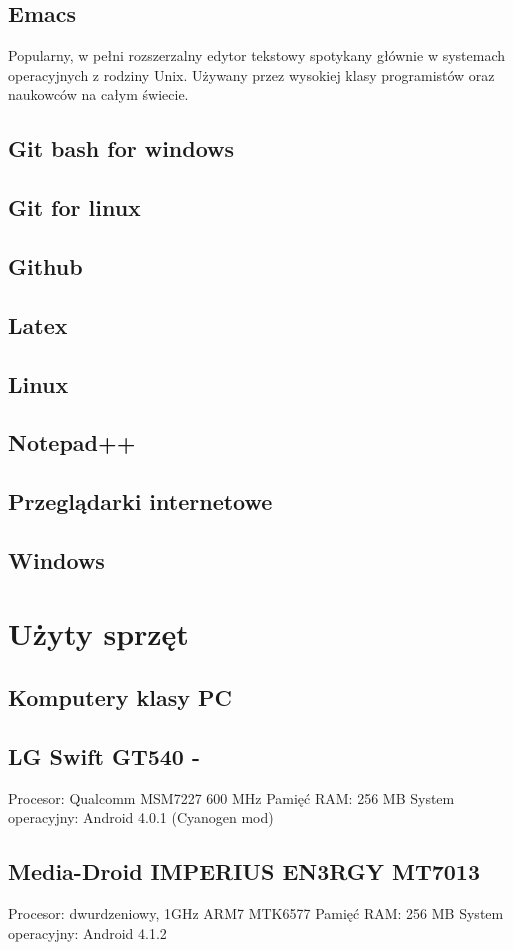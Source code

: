 \documentclass[11pt,a4paper,polish,thesis]{dcsbook}
\begin{document}
\subsection{Emacs}
Popularny, w pełni rozszerzalny edytor tekstowy spotykany głównie w systemach operacyjnych z rodziny Unix. Używany przez wysokiej klasy programistów oraz naukowców na całym świecie.
\subsection{Git bash for windows}
\subsection{Git for linux}
\subsection{Github}
\subsection{Latex}
\subsection{Linux}
\subsection{Notepad++}
\subsection{Przeglądarki internetowe}
\subsection{Windows}
\section{Użyty sprzęt}

\subsection{Komputery klasy PC}
\subsection{LG Swift GT540 - }
Procesor: Qualcomm MSM7227 600 MHz
Pamięć RAM: 256 MB
System operacyjny: Android 4.0.1 (Cyanogen mod)
\subsection{Media-Droid IMPERIUS EN3RGY MT7013}
Procesor: dwurdzeniowy, 1GHz ARM7 MTK6577
Pamięć RAM: 256 MB
System operacyjny: Android 4.1.2
\end{document}
